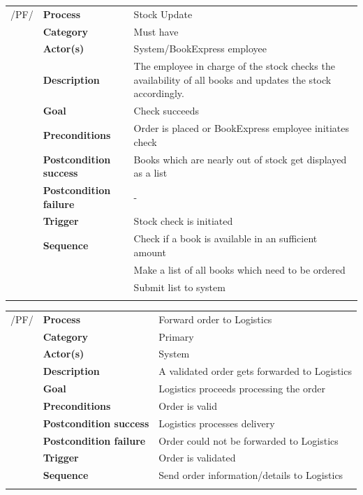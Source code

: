 \documentclass[11pt,a4paper,oneside,svgnames]{report}
\begin{document}
\noindent
\begin{tabular}{p{1.5cm}p{3cm}p{8cm}}
	 /PF/	& \textbf{Process} & Stock Update\\ 
		& \textbf{Category} & Must have\\
		& \textbf{Actor(s)} & System/BookExpress employee\\ 
		& \textbf{Description}	 & The employee in charge of the stock checks the availability of all books and updates the stock accordingly.\\ 
		& \textbf{Goal} & Check succeeds\\
		& \textbf{Preconditions} & Order is placed or BookExpress employee initiates check\\
		& \textbf{Postcondition success} & Books which are nearly out of stock get displayed as a list\\
		& \textbf{Postcondition failure} & -\\
		& \textbf{Trigger} & Stock check is initiated\\
		& \textbf{Sequence} & Check if a book is available in an sufficient amount\\
		& & Make a list of all books which need to be ordered\\
		& & Submit list to system\\
\hfill \\
\end{tabular}

\noindent
\begin{tabular}{p{1.5cm}p{3cm}p{8cm}}
	 /PF/	& \textbf{Process} & Forward order to Logistics\\ 
		& \textbf{Category} & Primary\\
		& \textbf{Actor(s)} & System\\ 
		& \textbf{Description}	 & A validated order gets forwarded to Logistics\\ 
		& \textbf{Goal} & Logistics proceeds processing the order\\
		& \textbf{Preconditions} & Order is valid\\
		& \textbf{Postcondition success} & Logistics processes delivery\\
		& \textbf{Postcondition failure} & Order could not be forwarded to Logistics\\
		& \textbf{Trigger} & Order is validated\\
		& \textbf{Sequence} & Send order information/details to Logistics\\
\hfill \\
\end{tabular}
\end{document}
